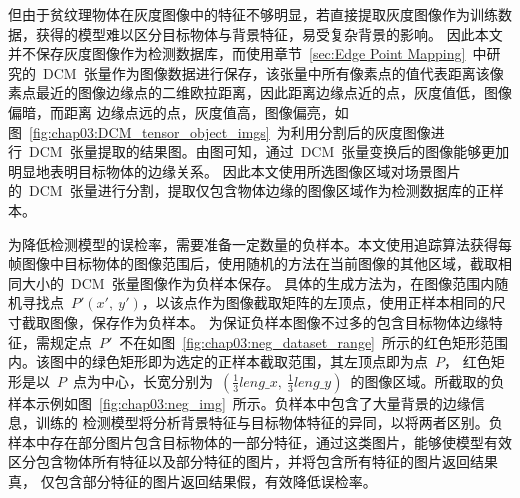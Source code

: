 但由于贫纹理物体在灰度图像中的特征不够明显，若直接提取灰度图像作为训练数据，获得的模型难以区分目标物体与背景特征，易受复杂背景的影响。
因此本文并不保存灰度图像作为检测数据库，而使用章节~\ref{sec:Edge Point Mapping}~中研究的~DCM~张量作为图像数据进行保存，该张量中所有像素点的值代表距离该像素点最近的图像边缘点的二维欧拉距离，因此距离边缘点近的点，灰度值低，图像偏暗，而距离
边缘点远的点，灰度值高，图像偏亮，如图~\ref{fig:chap03:DCM_tensor_object_imgs}~为利用分割后的灰度图像进行~DCM~张量提取的结果图。由图可知，通过~DCM~张量变换后的图像能够更加明显地表明目标物体的边缘关系。
因此本文使用所选图像区域对场景图片的~DCM~张量进行分割，提取仅包含物体边缘的图像区域作为检测数据库的正样本。

为降低检测模型的误检率，需要准备一定数量的负样本。本文使用追踪算法获得每帧图像中目标物体的图像范围后，使用随机的方法在当前图像的其他区域，截取相同大小的~DCM~张量图像作为负样本保存。
具体的生成方法为，在图像范围内随机寻找点~$P'(x',~y')$，以该点作为图像截取矩阵的左顶点，使用正样本相同的尺寸截取图像，保存作为负样本。
为保证负样本图像不过多的包含目标物体边缘特征，需规定点~$P'$~不在如图~\ref{fig:chap03:neg_dataset_range}~所示的红色矩形范围内。该图中的绿色矩形即为选定的正样本截取范围，其左顶点即为点~$P$，
红色矩形是以~$P$~点为中心，长宽分别为~$(\frac{1}{3}leng\_x,~\frac{1}{3}leng\_y)$~的图像区域。所截取的负样本示例如图~\ref{fig:chap03:neg_img}~所示。负样本中包含了大量背景的边缘信息，训练的
检测模型将分析背景特征与目标物体特征的异同，以将两者区别。负样本中存在部分图片包含目标物体的一部分特征，通过这类图片，能够使模型有效区分包含物体所有特征以及部分特征的图片，并将包含所有特征的图片返回结果真，
仅包含部分特征的图片返回结果假，有效降低误检率。

